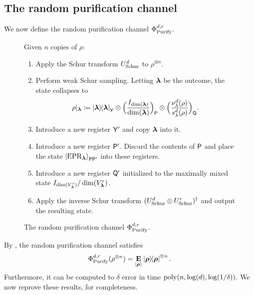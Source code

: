 \subsection{The random purification channel}

We now define the random purification channel $\Phi_{\mathrm{Purify}}^{d,r}$. 

{
\begin{figure}[H]
Given $n$ copies of $\rho$:
\begin{enumerate}
    \item Apply the Schur transform $U_{\mathrm{Schur}}^d$ to $\rho^{\otimes n}$.
    \item \label{item:intro-2} Perform weak Schur sampling. Letting $\boldsymbol{\lambda}$ be the outcome, the state collapses to
    \begin{equation*}
        \rho|_{\boldsymbol{\lambda}} \coloneqq \ketbra{\boldsymbol{\lambda}}_{\mathsf{Y}} \otimes \Big(\frac{I_{\dim(\boldsymbol{\lambda})}}{\dim(\boldsymbol{\lambda})}\Big)_{\mathsf{P}} \otimes \Big(\frac{\nu^d_{\lambda}(\rho)}{s^d_{\lambda}(\rho)}\Big)_{\mathsf{Q}}.
    \end{equation*}
    \item \label{item:intro-y} Introduce a new register $\mathsf{Y'}$ and copy $\boldsymbol{\lambda}$ into it.
    \item \label{item:intro-p}  Introduce a new register $\mathsf{P}'$. Discard the contents of $\mathsf{P}$ and place the state $\ket{\mathrm{EPR}_{\boldsymbol{\lambda}}}_{\mathsf{P}\mathsf{P}'}$ into these registers.
    \item \label{item:intro-q}  Introduce a new register $\mathsf{Q}'$ initialized to the maximally mixed state $I_{\dim(V^r_{\boldsymbol{\lambda}})}/\dim(V^r_{\boldsymbol{\lambda}})$.
    \item Apply the inverse Schur transform $(U_{\mathrm{Schur}}^d \otimes U_{\mathrm{Schur}}^r)^\dagger$ and output the resulting state.
\end{enumerate}
\caption{The random purification channel $\Phi_{\mathrm{Purify}}^{d,r}$.}
\label{fig:purify-channel}
\end{figure}
}

By \cite[Lemma 2.11]{TWZ25}, the random purification channel satisfies
\begin{equation*}
    \Phi_{\mathrm{Purify}}^{d,r}(\rho^{\otimes n}) = \mathop{\bf E\/}_{\ket{\boldsymbol{\rho}}} \ketbra{\boldsymbol{\rho}}^{\otimes n}.
\end{equation*}
Furthermore,
it can be computed to $\delta$ error in time $\operatorname{poly}(n, \log(d), \log(1/\delta))$.  We now reprove these results, for completeness. 

